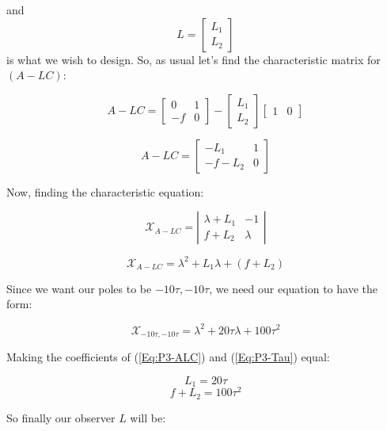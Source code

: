 \documentclass[10pt,a4paper]{article}
\begin{document}
and 
\[
L = 
\begin{bmatrix}L_{1} \\ L_{2} \end{bmatrix}
\]
is what we wish to design. So, as usual let's find the characteristic matrix for $(A-LC)$:

\[ A-LC = 
\begin{bmatrix}
0 & 1 \\ 
-f & 0 
\end{bmatrix}
-
\begin{bmatrix}L_{1} \\ L_{2} \end{bmatrix}
\begin{bmatrix}1 & 0 \end{bmatrix}
\] 
 
\[ A-LC = 
\begin{bmatrix}
-L_{1} & 1 \\ 
-f-L_{2} & 0 
\end{bmatrix}
\]  

Now, finding the characteristic equation:

\[ \mathcal{X}_{A-LC} =  \left | 
\begin{matrix}
\lambda + L_{1} & -1\\
f + L_{2} & \lambda 
\end{matrix}
\right | 
\]

\begin{equation} 
\mathcal{X}_{A-LC} =
\lambda^{2} + L_{1}\lambda + (f + L_{2})
\label{Eq:P3-ALC}
\end{equation}

Since we want our poles to be $-10\tau,-10\tau$, we need our equation to have the form:

\begin{equation} \mathcal{X}_{-10\tau, -10\tau} =
\lambda^{2} +20\tau \lambda + 100\tau^{2} 
\label{Eq:P3-Tau}
\end{equation}

Making the coefficients of (\ref{Eq:P3-ALC}) and (\ref{Eq:P3-Tau}) equal:

\[ L_{1} = 20\tau \]
\[ f + L_{2} = 100\tau^{2} \]

So finally our observer $L$ will be:

\begin{center}
\end{center}
\end{document}
